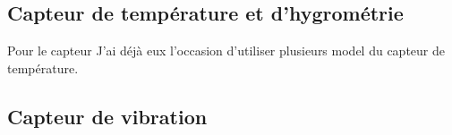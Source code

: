 \documentclass[5pt]{article}
\begin{document}
\subsection{Capteur de température et d'hygrométrie }
Pour le capteur 
J'ai déjà eux l'occasion d'utiliser plusieurs model du capteur de température.


\subsection{Capteur de vibration}



\end{document}
